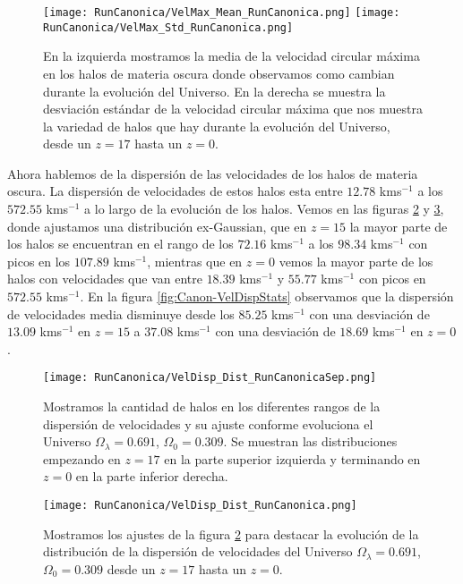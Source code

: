\begin{figure}[H]
    \centering
    \texttt{[image: RunCanonica/VelMax\_Mean\_RunCanonica.png]}
    \texttt{[image: RunCanonica/VelMax\_Std\_RunCanonica.png]}
    \caption[Media y desviación estándar de la velocidad circular máxima]{\footnotesize En la izquierda mostramos la media de la velocidad circular máxima en los halos de materia oscura donde observamos como cambian durante la evolución del Universo. En la derecha se muestra la desviación estándar de la velocidad circular máxima que nos muestra la variedad de halos que hay durante la evolución del Universo, desde un $z=17$ hasta un $z=0$.}
    \label{fig:Canon-VelMaxStats}
\end{figure}

Ahora hablemos de la dispersión de las velocidades de los halos de materia oscura. La dispersión de velocidades de estos halos esta entre $12.78$ kms$^{-1}$ a los $572.55$ kms$^{-1}$ a lo largo de la evolución de los halos. Vemos en las figuras \ref{fig:Canon-VelDispDistSep} y \ref{fig:Canon-VelDispDist}, donde ajustamos una distribución ex-Gaussian, que en $z=15$ la mayor parte de los halos se encuentran en el rango de los $72.16$ kms$^{-1}$ a los $98.34$ kms$^{-1}$ con picos en los $107.89$ kms$^{-1}$, mientras que en $z=0$ vemos la mayor parte de los halos con velocidades que van entre $18.39$ kms$^{-1}$ y $55.77$ kms$^{-1}$ con picos en $572.55$ kms$^{-1}$. En la figura \ref{fig:Canon-VelDispStats} observamos que la dispersión de velocidades media disminuye desde los $85.25$ kms$^{-1}$ con una desviación de $13.09$ kms$^{-1}$ en $z=15$ a $37.08$ kms$^{-1}$ con una desviación de $18.69$ kms$^{-1}$ en $z=0$.

\begin{figure}[H]
    \centering
    \texttt{[image: RunCanonica/VelDisp\_Dist\_RunCanonicaSep.png]}
    \caption[Dispersión de velocidades]{\footnotesize Mostramos la cantidad de halos en los diferentes rangos de la dispersión de velocidades y su ajuste conforme evoluciona el Universo $\Omega_\lambda = 0.691 $, $\Omega_0 = 0.309$. Se muestran las distribuciones empezando en $z=17$ en la parte superior izquierda y terminando en $z=0$ en la parte inferior derecha.}
    \label{fig:Canon-VelDispDistSep}
\end{figure}

\begin{figure}[H]
    \centering
    \texttt{[image: RunCanonica/VelDisp\_Dist\_RunCanonica.png]}
    \caption[Distribución de la dispersión de velocidades]{\footnotesize Mostramos los ajustes de la figura \ref{fig:Canon-VelDispDistSep} para destacar la evolución de la distribución de la dispersión de velocidades del Universo $\Omega_\lambda = 0.691 $, $\Omega_0 = 0.309$ desde un $z=17$ hasta un $z=0$.}
    \label{fig:Canon-VelDispDist}
\end{figure}

